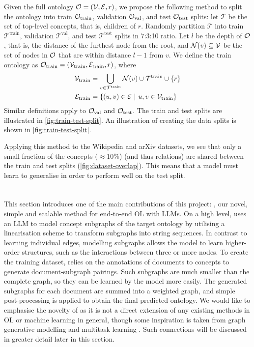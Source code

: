 Given the full ontology $\mathcal{O} = (\mathcal{V}, \mathcal{E}, r)$, we propose the following method to split the ontology into train $\mathcal{O}_{\text{train}}$, validation $\mathcal{O}_{\text{val}}$, and test $\mathcal{O}_{\text{test}}$ splits: let $\mathcal{T}$ be the set of top-level concepts, that is, children of $r$. Randomly partition $\mathcal{T}$ into train $\mathcal{T}^{\text{train}}$, validation $\mathcal{T}^{\text{val}}$, and test $\mathcal{T}^{\text{test}}$ splits in 7:3:10 ratio. Let $l$ be the depth of $\mathcal{O}$, that is, the distance of the furthest node from the root, and $\mathcal{N}(v) \subseteq \mathcal{V}$ be the set of nodes in $\mathcal{O}$ that are within distance $l-1$ from $v$. We define the train ontology as $\mathcal{O}_{\text{train}} = (\mathcal{V}_{\text{train}}, \mathcal{E}_{\text{train}}, r)$, where
\begin{equation*}
    \begin{aligned}
        \mathcal{V}_{\text{train}} & = \bigcup_{v \in \mathcal{T}^{\text{train}}} \mathcal{N}(v) \cup \mathcal{T}^{\text{train}} \cup \{r\} \\
        \mathcal{E}_{\text{train}} & = \{(u, v) \in \mathcal{E}\ |\ u, v \in \mathcal{V}_{\text{train}}\}
    \end{aligned}
\end{equation*}
Similar definitions apply to $\mathcal{O}_{\text{val}}$ and $\mathcal{O}_{\text{test}}$. The train and test splits are illustrated in \cref{fig:train-test-split}. An illustration of creating the data splits is shown in \cref{fig:train-test-split}.


Applying this method to the Wikipedia and arXiv datasets, we see that only a small fraction of the concepts ($\approx 10\%$) (and thus relations) are shared between the train and test splits (\cref{fig:dataset-overlap}). This means that a model must learn to generalise in order to perform well on the test split.


\section{\name}  \label{sec:implementation:core}

This section introduces one of the main contributions of this project: \name, our novel, simple and scalable method for end-to-end OL with LLMs. On a high level, \name uses an LLM to model concept subgraphs of the target ontology by utilising a linearisation scheme to transform subgraphs into string sequences. In contrast to learning individual edges, modelling subgraphs allows the model to learn higher-order structures, such as the interactions between three or more nodes. To create the training dataset, \name relies on the annotations of documents to concepts to generate document-subgraph pairings. Such subgraphs are much smaller than the complete graph, so they can be learned by the model more easily. The generated subgraphs for each document are summed into a weighted graph, and simple post-processing is applied to obtain the final predicted ontology. We would like to emphasise the novelty of \name as it is not a direct extension of any existing methods in OL or machine learning in general, though some inspiration is taken from graph generative modelling \cite{li2018learning} and multitask learning \cite{caruana1997multitask}. Such connections will be discussed in greater detail later in this section.

